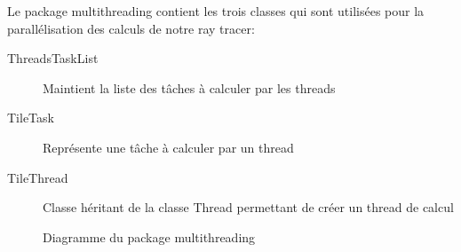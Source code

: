 \documentclass[../../Rapport RayTracer]{subfiles}
\begin{document}
	\label{packageMultithreading}
	
	Le package multithreading contient les trois classes qui sont utilisées pour la parallélisation des calculs de notre ray tracer:
	\begin{description}
		\item [ThreadsTaskList] Maintient la liste des tâches à calculer par les threads
		\item [TileTask] Représente une tâche à calculer par un thread
		\item [TileThread] Classe héritant de la classe Thread permettant de créer un thread de calcul
	\end{description}
	
	\begin{figure}[h!]
		
		\caption{Diagramme du package multithreading}
		\label{packageMultithreadingFigure}
	\end{figure}
	\FloatBarrier
	
\end{document}
